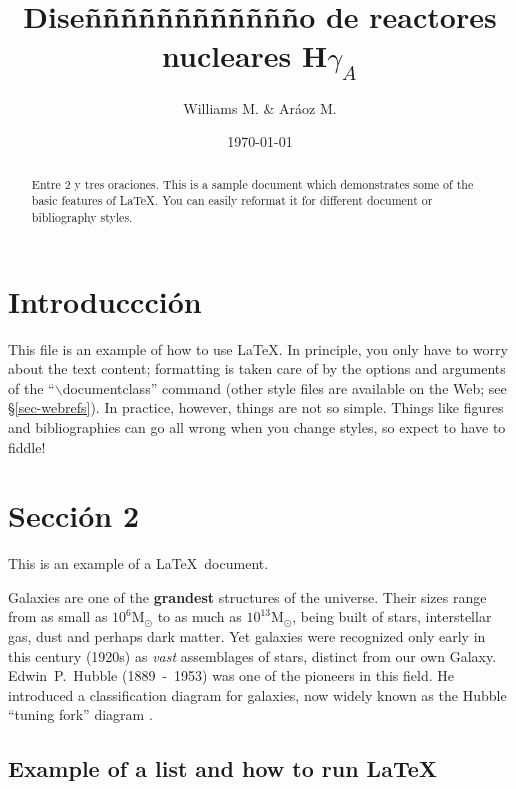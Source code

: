 \documentclass[11pt,a4paper]{emulateapj}
\def \HgA {H$\gamma_A$}
\begin{document}
\title{Diseñññññññññññño de reactores nucleares \HgA}
\author{Williams M. \& Aráoz M.}
\date{\today}


\begin{abstract}
Entre 2 y tres oraciones.
This is a sample document which demonstrates some of the basic features
of \LaTeX.  You can easily reformat it for different document or bibliography styles.
\end{abstract}

\maketitle




\section{Introduccción}
This file is an example of how to use \LaTeX.  In principle, you only have to worry
about the text content; formatting is taken care of by the options and arguments of
the ``$\backslash$documentclass'' command (other style files are available on the Web;
see \S\ref{sec-webrefs}).  In practice, however, things are not so simple.  Things like
figures and bibliographies can go all wrong when you change styles, so expect to have
to fiddle!  

\section{Sección 2}

This is an example of a \LaTeX\ document.  

\medskip

Galaxies are one of the \textbf{grandest} structures of the universe.
Their sizes range from as small as $10^6 \text{M}_\odot$ to as much as
$10^{13} \text{M}_\odot$, being built of stars, interstellar gas, dust
and perhaps dark matter. Yet galaxies were recognized only early in
this century (1920s) as \textit{vast} assemblages of stars, distinct
from our own Galaxy. Edwin~P.~Hubble (1889~-~1953) was one of the
pioneers in this field. He introduced a classification diagram for
galaxies, now widely known as the Hubble ``tuning fork'' diagram
\cite[][see Figure~\ref{fig:hubble_dia} for a revised Hubble
diagram]{hub36}.


%
%
\subsection{Example of a list and how to run \LaTeX} 
\end{document}
